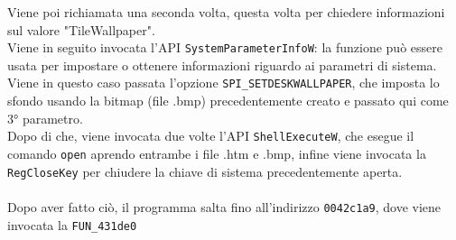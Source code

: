 \documentclass[12pt]{extarticle}
\begin{document}
Viene poi richiamata una seconda volta, questa volta per chiedere informazioni sul valore "TileWallpaper".\\Viene in seguito invocata l'API \texttt{SystemParameterInfoW}: la funzione può essere usata per impostare o ottenere informazioni riguardo ai parametri di sistema. Viene in questo caso passata l'opzione \texttt{SPI\_SETDESKWALLPAPER}, che imposta lo sfondo usando la bitmap (file .bmp) precedentemente creato e passato qui come 3° parametro.\\Dopo di che, viene invocata due volte l'API \texttt{ShellExecuteW}, che esegue il comando \texttt{open} aprendo entrambe i file .htm e .bmp, infine viene invocata la \texttt{RegCloseKey} per chiudere la chiave di sistema precedentemente aperta.\\\\Dopo aver fatto ciò, il programma salta fino all'indirizzo \texttt{0042c1a9}, dove viene invocata la \texttt{FUN\_431de0}
\end{document}
